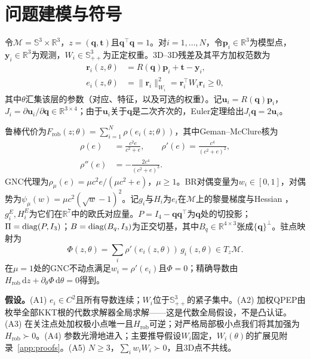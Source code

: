 \section{问题建模与符号}
\label{sec:formulation}

令$\mathcal{M}=\mathbb{S}^3\times\mathbb{R}^3$，$z=(\mathbf{q},\mathbf{t})$且$\mathbf{q}^\top\mathbf{q}=1$。对$i=1,\dots,N$，令$\mathbf{p}_i\in\mathbb{R}^3$为模型点，$\mathbf{y}_i\in\mathbb{R}^3$为观测，$W_i\in\mathbb{S}^3_{++}$为正定权重。3D--3D残差及其平方加权范数为
\begin{equation}
\begin{aligned}
\mathbf{r}_i(z,\theta)&=R(\mathbf{q})\mathbf{p}_i+\mathbf{t}-\mathbf{y}_i,\\
e_i(z,\theta)&=\|\mathbf{r}_i\|_{W_i}^2=\mathbf{r}_i^\top W_i\mathbf{r}_i\ge0,
\end{aligned}
\end{equation}
其中$\theta$汇集该层的参数（对应、特征，以及可选的权重）。记$\mathbf{u}_i=R(\mathbf{q})\mathbf{p}_i$，$J_i=\partial\mathbf{u}_i/\partial\mathbf{q}\in\mathbb{R}^{3\times4}$；由于$\mathbf{u}_i$关于$\mathbf{q}$是二次齐次的，Euler定理给出$J_i\mathbf{q}=2\mathbf{u}_i$。

鲁棒代价为$F_{\mathrm{rob}}(z;\theta)=\sum_{i=1}^N\rho(e_i(z;\theta))$，其中Geman--McClure核为
\begin{equation}
\begin{aligned}
\rho(e)&=\frac{c^2e}{c^2+e},\qquad
\rho'(e)=\frac{c^4}{(c^2+e)^2},\\
\rho''(e)&=-\frac{2c^4}{(c^2+e)^3}.
\end{aligned}
\end{equation}
GNC代理为$\rho_\mu(e)=\mu c^2e/(\mu c^2+e)$，$\mu\ge1$。BR对偶变量为$w_i\in[0,1]$，对偶势为$\psi_\mu(w)=\mu c^2(\sqrt{w}-1)^2$。记$g_i$与$H_i$为$e_i$在$\mathcal{M}$上的黎曼梯度与Hessian \cite{absil2008}，$g_i^E,H_i^E$为它们在$\mathbb{R}^7$中的欧氏对应量。$P=I_4-\mathbf{q}\mathbf{q}^\top$为$\mathbf{q}$处的切投影；$\Pi=\operatorname{diag}(P,I_3)$；$B=\operatorname{diag}(B_q,I_3)$为正交切基，其中$B_q\in\mathbb{R}^{4\times3}$张成$\{\mathbf{q}\}^{\perp}$。驻点映射为
\begin{equation}
\Phi(z,\theta)=\sum_i\rho'(e_i(z,\theta))\,g_i(z,\theta)\in T_z\mathcal{M}.
\label{eq:phi}
\end{equation}
在$\mu=1$处的GNC不动点满足$w_i=\rho'(e_i)$且$\Phi=0$；精确导数由$H_{\mathrm{rob}}\,\mathrm{d}z+\partial_\theta\Phi\,\mathrm{d}\theta=0$得到。

\noindent\textbf{假设。}(A1) $e_i\in C^2$且所有导数连续；$W_i$位于$\mathbb{S}^3_{++}$的紧子集中。(A2) 加权QPEP由枚举全部KKT根的代数求解器全局求解——这是代数全局假设，不是凸认证。(A3) 在关注点处加权极小点唯一且$H_{\mathrm{rob}}$可逆；对严格局部极小点我们将其加强为$H_{\mathrm{rob}}\succ0$。(A4) 参数光滑地进入；主要推导假设$W_i$固定，$W_i(\theta)$的扩展见附录~\ref{app:proofs}。(A5) $N\ge3$，$\sum_iw_iW_i\succ0$，且3D点不共线。
